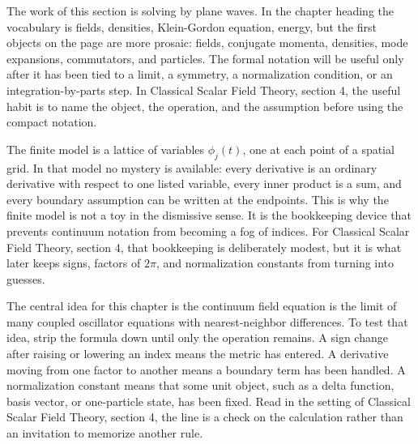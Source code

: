 











The work of this section is solving by plane waves.  In the chapter heading the vocabulary is fields, densities, Klein-Gordon equation, energy, but the first objects on the page are more prosaic: fields, conjugate momenta, densities, mode expansions, commutators, and particles.  The formal notation will be useful only after it has been tied to a limit, a symmetry, a normalization condition, or an integration-by-parts step.  In Classical Scalar Field Theory, section 4, the useful habit is to name the object, the operation, and the assumption before using the compact notation.

The finite model is a lattice of variables \(\phi_j(t)\), one at each point of a spatial grid.  In that model no mystery is available: every derivative is an ordinary derivative with respect to one listed variable, every inner product is a sum, and every boundary assumption can be written at the endpoints.  This is why the finite model is not a toy in the dismissive sense.  It is the bookkeeping device that prevents continuum notation from becoming a fog of indices.  For Classical Scalar Field Theory, section 4, that bookkeeping is deliberately modest, but it is what later keeps signs, factors of \(2\pi\), and normalization constants from turning into guesses.

The central idea for this chapter is the continuum field equation is the limit of many coupled oscillator equations with nearest-neighbor differences.  To test that idea, strip the formula down until only the operation remains.  A sign change after raising or lowering an index means the metric has entered.  A derivative moving from one factor to another means a boundary term has been handled.  A normalization constant means that some unit object, such as a delta function, basis vector, or one-particle state, has been fixed.  Read in the setting of Classical Scalar Field Theory, section 4, the line is a check on the calculation rather than an invitation to memorize another rule.

